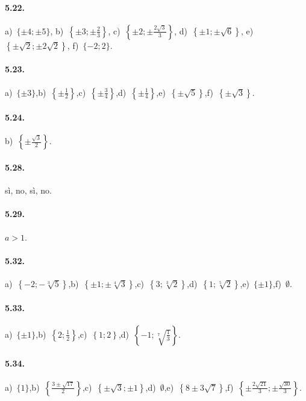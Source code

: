 \paragraph{5.22.} a)~$\{\pm 4;\pm 5\}$,\; b)~$\left\{\pm 3;\pm \frac 2 3\right\}$,\; c)~$\left\{\pm 2;\pm \frac{2\sqrt 3} 3\right\}$,\; d)~$\left\{\pm 1;\pm \sqrt 6\right\}$,\; e)~$\left\{\pm \sqrt 2;\pm 2\sqrt 2\right\}$,\; f)~$\{-2;2\}$.

\paragraph{5.23.} a)~$\{\pm 3\}$,\quad b)~$\left\{\pm \frac 1 2\right\}$,\quad c)~$\left\{\pm \frac 3 4\right\}$,\quad d)~$\left\{\pm \frac 1 4\right\}$,\quad e)~$\left\{\pm \sqrt 5\right\}$,\quad f)~$\left\{\pm \sqrt 3\right\}$.

\paragraph{5.24.} b)~$\left\{\pm \frac{\sqrt 3} 2\right\}$.

\paragraph{5.28.} sì, no, sì, no.

\paragraph{5.29.} $a>1$.

\paragraph{5.32.} a)~$\left\{-2;-\sqrt[3]5\right\}$,\quad b)~$\left\{\pm 1;\pm \sqrt[4]3\right\}$,\quad c)~$\left\{3;\sqrt[3]2\right\}$,\quad d)~$\left\{1;\sqrt[5]2\right\}$,\quad e)~$\{\pm 1\}$,\quad f)~$\emptyset $.

\paragraph{5.33.} a)~$\{\pm 1\}$,\quad b)~$\left\{2;\frac 1 2\right\}$,\quad c)~$\left\{1;2\right\}$,\quad d)~$\left\{-1;\sqrt[7]{\frac 1 3}\right\}$.

\paragraph{5.34.} a)~$\{1\}$,\quad b)~$\left\{\frac{3\pm\sqrt{17}} 2\right\}$,\quad c)~$\left\{\pm\sqrt 3;\pm 1\right\}$,\quad d)~$\emptyset $,\quad e)~$\left\{8\pm3\sqrt 7\right\}$,\quad f)~$\left\{\pm \frac{2\sqrt{21}} 3;\pm \frac{\sqrt{30}} 3\right\}$.

